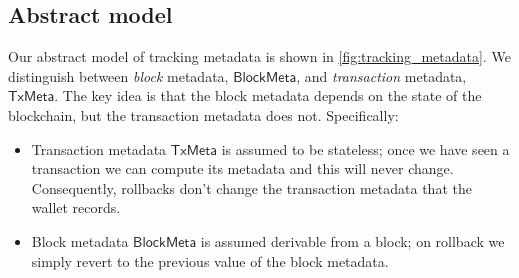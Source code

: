 \documentclass{article}
\theoremstyle{definition}{
  \newtheorem{lemma}{Lemma}[section] %
  \newtheorem{definition}[lemma]{Definition}
}
\theoremstyle{theorem}{
  \newtheorem{invariant}[lemma]{Invariant}
  \newtheorem{proofobligation}[lemma]{Proof Obligation}
}
\numberwithin{equation}{lemma}
\begin{document}
\subsection{Abstract model}
\label{sec:abstract_metadata}

Our abstract model of tracking metadata is shown in
\cref{fig:tracking_metadata}. We distinguish between \emph{block}
metadata, $\mathsf{BlockMeta}$, and \emph{transaction} metadata,
$\mathsf{TxMeta}$. The key idea is that the block metadata depends on the
state of the blockchain, but the transaction metadata does not. Specifically:

\begin{itemize}
\item Transaction metadata $\mathsf{TxMeta}$ is assumed to be stateless;
once we have seen a transaction we can compute its metadata and this will never
change. Consequently, rollbacks don't change the transaction metadata that the
wallet records.
\item Block metadata $\mathsf{BlockMeta}$ is assumed derivable from a block;
on rollback we simply revert to the previous value of the block metadata.
\end{itemize}
\end{document}
